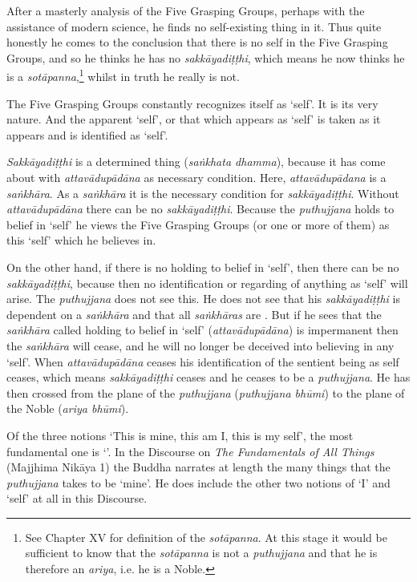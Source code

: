 After a masterly analysis of the Five Grasping Groups, perhaps with the assistance of modern science, he finds no self-existing thing in it. Thus quite honestly he comes to the conclusion that there is no self in the Five Grasping Groups, and so he thinks he has no \emph{sakkāyadiṭṭhi}, which means he now thinks he is a \emph{sotāpanna},\footnote{See Chapter XV for definition of the \emph{sotāpanna}. At this stage it would be sufficient to know that the \emph{sotāpanna} is not a \emph{puthujjana} and that he is therefore an \emph{ariya}, i.e. he is a Noble.} whilst in truth he really is not.

The Five Grasping Groups constantly recognizes itself as `self'. It is its very nature. And the apparent `self', or that which appears as `self' is taken as it appears and is identified as `self'.

\emph{Sakkāyadiṭṭhi} is a determined thing (\emph{saṅkhata dhamma}), because it has come about with \emph{attavādupādāna} as necessary condition. Here, \emph{attavādupādana} is a \emph{saṅkhāra}. As a \emph{saṅkhāra} it is the necessary condition for \emph{sakkāyadiṭṭhi}. Without \emph{attavādupādāna} there can be no \emph{sakkāyadiṭṭhi}. Because the \emph{puthujjana} holds to belief in `self' he views the Five Grasping Groups (or one or more of them) as this `self' which he believes in.

On the other hand, if there is no holding to belief in `self', then there can be no \emph{sakkāyadiṭṭhi}, because then no identification or regarding of anything as `self' will arise. The \emph{puthujjana} does not see this. He does not see that his \emph{sakkāyadiṭṭhi} is dependent on a \emph{saṅkhāra} and that all \emph{saṅkhāras} are . But if he sees that the \emph{saṅkhāra} called holding to belief in `self' (\emph{attavādupādāna}) is impermanent then the \emph{saṅkhāra} will cease, and he will no longer be deceived into believing in any `self'. When \emph{attavādupādāna} ceases his identification of the sentient being as self ceases, which means \emph{sakkāyadiṭṭhi} ceases and he ceases to be a \emph{puthujjana}. He has then crossed from the plane of the \emph{puthujjana} (\emph{puthujjana bhūmi}) to the plane of the Noble (\emph{ariya bhūmi}).

Of the three notions `This is mine, this am I, this is my self', the most fundamental one is `'. In the Discourse on \emph{The Fundamentals of All Things} (Majjhima Nikāya 1) the Buddha narrates at length the many things that the \emph{puthujjana} takes to be `mine'. He does  include the other two notions of `I' and `self' at all in this Discourse.

